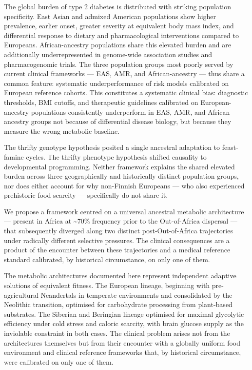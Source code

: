 \documentclass[
  letterpaper,
  DIV=11,
  numbers=noendperiod]{scrartcl}
\begin{document}
The global burden of type 2 diabetes is distributed with striking
population specificity. East Asian and admixed American populations show
higher prevalence, earlier onset, greater severity at equivalent body
mass index, and differential response to dietary and pharmacological
interventions compared to Europeans. African-ancestry populations share
this elevated burden and are additionally underrepresented in
genome-wide association studies and pharmacogenomic trials. The three
population groups most poorly served by current clinical frameworks ---
EAS, AMR, and African-ancestry --- thus share a common feature:
systematic underperformance of risk models calibrated on European
reference cohorts. This constitutes a systematic clinical bias:
diagnostic thresholds, BMI cutoffs, and therapeutic guidelines
calibrated on European-ancestry populations consistently underperform in
EAS, AMR, and African-ancestry groups not because of differential
disease biology, but because they measure the wrong metabolic baseline.

The thrifty genotype hypothesis posited a single ancestral adaptation to
feast-famine cycles. The thrifty phenotype hypothesis shifted causality
to developmental programming. Neither framework explains the shared
elevated burden across three geographically and historically distinct
population groups, nor does either account for why non-Finnish Europeans
--- who also experienced prehistoric food scarcity --- specifically do
not share it.

We propose a framework centred on a universal ancestral metabolic
architecture --- present in Africa at \textasciitilde70\% frequency
prior to the Out-of-Africa dispersal --- that subsequently diverged
along two distinct post-Out-of-Africa trajectories under radically
different selective pressures. The clinical consequences are a product
of the encounter between these trajectories and a medical reference
standard calibrated, by historical circumstance, on only one of them.

The metabolic architectures documented here represent independent
adaptive solutions of equivalent fitness. The European lineage,
beginning with pre-agricultural Neandertals in temperate environments
and consolidated by the Neolithic transition, optimised for carbohydrate
processing from plant-based substrates. The Siberian and Beringian
lineage optimised for maximal glycolytic efficiency under cold stress
and caloric scarcity, with brain glucose supply as the inviolable
constraint in both cases. The clinical problem arises not from the
architectures themselves but from their encounter with a globally
uniform food environment and clinical reference frameworks that, by
historical circumstance, were calibrated on only one of them.
\end{document}
